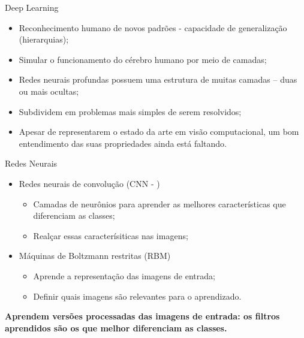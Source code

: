 \documentclass{beamer}
\begin{document}
\begin{frame}{Deep Learning}
\setlength\leftmargini{0em}
\justifying
\begin{itemize}
  \item Reconhecimento humano de novos padrões - capacidade de generalização (hierarquias);%
  \item Simular o funcionamento do cérebro humano por meio de camadas;
  \item Redes neurais profundas possuem uma estrutura de muitas camadas -- duas ou mais ocultas; %
  \item Subdividem em problemas mais simples de serem resolvidos;
  \item Apesar de representarem o estado da arte em visão computacional, um bom entendimento das suas propriedades ainda está faltando.
\end{itemize}
\end{frame}
\begin{frame}{Redes Neurais}
\setlength\leftmargini{0em}
\justifying
  \begin{itemize}
    \item Redes neurais de convolução (CNN - \cite{lecun1998})
    \begin{itemize}
        \item<2> Camadas de neurônios para aprender as melhores características que diferenciam as classes;
        \item<2> Realçar essas caracterísiticas nas imagens;
    \end{itemize}
    \item <1,3> Máquinas de Boltzmann restritas (RBM)
    \begin{itemize}
        \item<3> Aprende a representação das imagens de entrada;
        \item<3> Definir quais imagens são relevantes para o aprendizado.
    \end{itemize}
  \end{itemize}
\textbf{Aprendem versões processadas das imagens de entrada: os filtros aprendidos são os que melhor diferenciam as classes.}
\end{frame}
\end{document}

